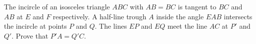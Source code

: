\problem
The incircle of an isosceles triangle $ABC$ with $AB = BC$ is tangent to $BC$
and $AB$ at $E$ and $F$ respectively.
A half-line trough $A$ inside the angle $EAB$ intersects the incircle at points
$P$ and $Q$.
The lines $EP$ and $EQ$ meet the line $AC$ at $P'$ and $Q'$.
Prove that $P'A = Q'C$.
\solution
\endproblem
